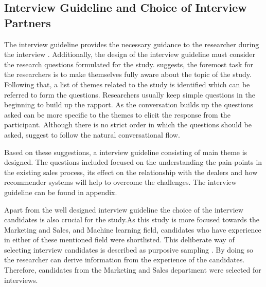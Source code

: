 \subsection{Interview Guideline and Choice of Interview Partners}
The interview guideline provides the necessary guidance to the researcher during the interview \autocite[65]{fylan2005semi}. Additionally, the design of the interview guideline must consider the research questions formulated for the study. \textcite[106]{longhurst2003semi} suggests, the foremost task for the researchers is to make themselves fully aware about the topic of the study. Following that, a list of themes related to the study is identified which can be referred to form the questions. Researchers usually keep simple questions in the beginning to build up the rapport. As the conversation builds up the questions asked can be more specific to the themes to elicit the response from the participant. Although there is no strict order in which the questions should be asked, \textcite[107]{longhurst2003semi} suggest to follow the natural conversational flow.\\ 
\par Based on these suggestions, a interview guideline consisting of main theme is designed. The questions included focused on the understanding the pain-points in the existing sales process, its effect on the relationship with the dealers and how recommender systems will help to overcome the challenges. The interview guideline can be found in appendix. \\ 
\par
Apart from the well designed interview guideline the choice of the interview candidates is also crucial for the study.As this study is more focused towards the Marketing and Sales, and Machine learning field, candidates who have experience in either of these mentioned field were shortlisted. This deliberate way of selecting interview candidates is described as purposive sampling \autocite[68]{etikan2016comparison}. By doing so the researcher can derive information from the experience of the candidates. Therefore, candidates from the Marketing and Sales department were selected for interviews.

